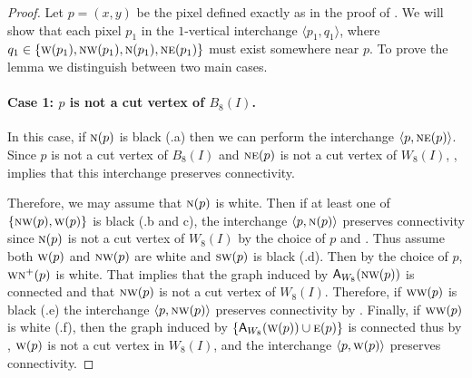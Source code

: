 \documentclass[lotsofwhite,charterfonts]{patmorin}
\newcommand{\N}{\textsc{n}}
\newcommand{\NE}{\textsc{ne}}
\newcommand{\E}{\textsc{e}}
\renewcommand{\S}{\textsc{s}}
\newcommand{\SW}{\textsc{sw}}
\newcommand{\W}{\textsc{w}}
\newcommand{\NW}{\textsc{nw}}
\newcommand{\x}{\ensuremath{\protect\textup{\textsf{x}}}}
\newcommand{\ic}[2]{\langle #1,#2 \rangle}
\newcommand{\A}[2]{\ensuremath{\protect\textup{\textsf{A}}_{#2}(#1)}}
\begin{document}
\begin{proof}
Let $p=(x,y)$ be the pixel defined exactly as in the proof of .
%
We will show that each pixel $p_1$ in the $1$-vertical interchange $\ic{p_1}{q_1}$, where $q_1\in\{\W(p_1),\NW(p_1),\N(p_1),\NE(p_1)\}$ must exist somewhere near $p$. To prove the lemma we distinguish between two main cases.


\paragraph{Case 1: $p$ is not a cut vertex of $B_8(I)$.} 

In this case, if $\N(p)$ is black (.a) then we can perform
the interchange $\ic{p}{\NE(p)}$.  Since $p$ is not a cut vertex of
$B_8(I)$ and $\NE(p)$ is not a cut vertex of $W_8(I)$,
, implies that this interchange preserves
connectivity.

Therefore, we may assume that $\N(p)$ is white. Then if at least one of $\{\NW(p), \W(p)\}$ is black (.b and c), the interchange $\ic{p}{\N(p)}$ preserves connectivity since $\N(p)$ is not a cut vertex of $W_8(I)$ by the choice of $p$ and . Thus assume both $\W(p)$ and $\NW(p)$ are white and $\SW(p)$ is black (.d). Then by the choice of $p$, $\W\N^+(p)$ is white. That implies that the graph induced by \A{\NW(p)}{W_8} is connected and that $\NW(p)$ is not a cut vertex of  $W_8(I)$. Therefore, if $\W\W(p)$ is black  (.e) the interchange $\ic{p}{\NW(p)}$ preserves connectivity by . Finally, if $\W\W(p)$ is white (.f), then the graph induced by $\{\A{\W(p)}{W_8}\cup \E(p)\}$ is connected thus by , $\W(p)$ is not a cut vertex in $W_8(I)$, and the interchange $\ic{p}{\W(p)}$ preserves connectivity.



\end{proof}
\end{document}
